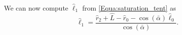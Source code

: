 \documentclass[reqno]{amsart}
\theoremstyle{definition} \newtheorem{definition}{Definition}[section]
\theoremstyle{definition} \newtheorem{remark}[definition]{Remark}
\theoremstyle{plain} \newtheorem{lemma}[definition]{Lemma}
\theoremstyle{plain} \newtheorem{proposition}[definition]{Proposition}
\theoremstyle{plain} \newtheorem{theorem}[definition]{Theorem}
\theoremstyle{plain} \newtheorem{corollary}[definition]{Corollary}
\theoremstyle{definition} \newtheorem{example}[definition]{Example}
\theoremstyle{plain} \newtheorem{claim}[clai]{Claim}
\theoremstyle{definition} \newtheorem{assumption}[definition]{Assumption}
\theoremstyle{definition} \newtheorem{observation}[definition]{Observation}
\newcommand{\1}{\mathbbm 1}
\renewcommand{\i}{\imath}
\numberwithin{equation}{section} %
\theoremstyle{plain} \newtheorem*{theorem*}{Theorem}
\theoremstyle{plain} \newtheorem{mthm}[maintheorem]{Main Theorem}
\theoremstyle{plain} \newtheorem*{mthm*}{Main Theorem}
\theoremstyle{plain} \newtheorem*{conjecture*}{Conjecture}
\theoremstyle{plain} \newtheorem{conjecture}[definition]{Conjecture}
\theoremstyle{plain} \newtheorem*{problem*}{Problem}
\begin{document}
We can now compute $\hat \ell_1$ from \eqref{Equa:saturation_tent} as
\begin{equation*}
\hat \ell_1 = \frac{\hat r_2 + \hat L  -\hat r_0 - \cos(\bar \alpha) \hat \ell_0}{\cos(\bar \alpha)}.
\end{equation*}
\end{document}
